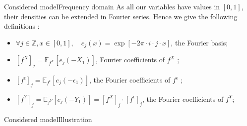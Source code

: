 \documentclass[10pt]{beamer}
\begin{document}

\begin{frame}{Considered model}{Frequency domain}
As all our variables have values in $[0,1]$, their densities can be extended in Fourier series.
Hence we give the following definitions :

\medskip

\begin{itemize}
\setlength\itemsep{2em}
\item $\forall j \in \mathbb{Z}, x \in [0,1], \quad e_{j}(x) = \exp\left[- 2 \pi \cdot i \cdot j \cdot x\right]$, the Fourier basis;
\item $\left[f^{X}\right]_{j} = \mathbb{E}_{f^{X}}\left[e_{j}(-X_{1})\right]$, Fourier coefficients of $f^{X}$ ;
\item $\left[f^{\epsilon}\right]_{j} = \mathbb{E}_{f^{\epsilon}}\left[e_{j}(-\epsilon_{1})\right]$, the Fourier coefficients of $f^{\epsilon}$ ;
\item $\left[f^{Y}\right]_{j} = \mathbb{E}_{f^{Y}}\left[e_{j}(-Y_{1})\right] = \left[f^{X}\right]_{j} \cdot\left[f^{\epsilon}\right]_{j}$, the Fourier coefficients of $f^{Y}$;
\end{itemize}
\end{frame}

\begin{frame}{Considered model}{Illustration}
\begin{center}
\end{center}
\end{frame}
\end{document}
